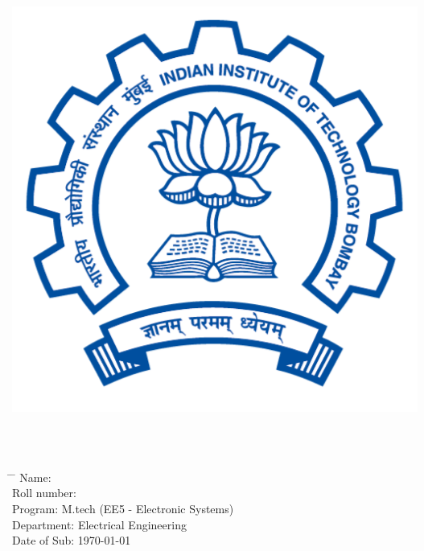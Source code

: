 
	\newcommand{\subf}[2]{%
		{\small\begin{tabular}[t]{@{}c@{}}
				#1\\#2
		\end{tabular}}%
	}
	
	\begin{titlepage}
		\begin{center}
			\vspace*{0.5cm}

		\includegraphics[scale = 0.3]{iit-bombay-logo.png}
                \vspace{0.5cm}
                
			\Huge
			\textbf{\assgn}
            \vspace{0.3cm}\\
            \LARGE \textbf{\assgnTitle}\\
			\vspace{0.3cm}
			\Huge
			\textbf{\course}

             
   
		\end{center}

 \tableofcontents
  
		\begin{tabbing}
			\hspace*{1em}\= \hspace*{8em} \= \kill %
			\> Name:\>  \textbf{\name} \\
			\> Roll number:\>  \enrl \\
            \> Program:\>  M.tech (EE5 - Electronic Systems) \\
			\> Department:\>  Electrical Engineering  \\
			\> Date of Sub: \>  \today
		\end{tabbing}
		
	\end{titlepage}

